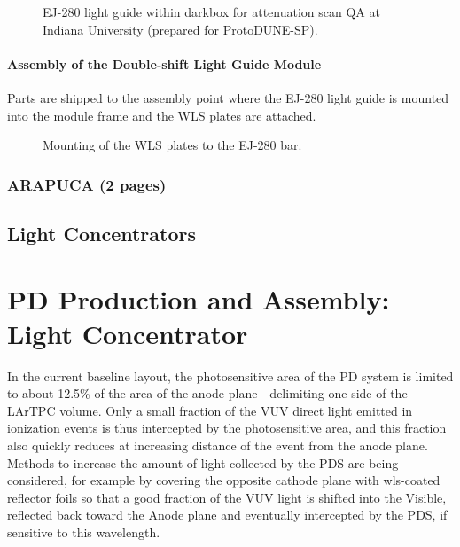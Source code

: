 \begin{figure}[ht]
  \begin{center}
  \caption{EJ-280 light guide within darkbox for attenuation scan QA at 
Indiana University (prepared for ProtoDUNE-SP).}\label{fig:DoubleShiftLG-EJ280}
  \end{center}
\end{figure}

\paragraph*{Assembly of the Double-shift Light Guide Module}

Parts are shipped to the assembly point where the EJ-280 light guide is mounted 
into the module frame and the WLS plates are attached.

\begin{figure}[ht]
  \begin{center}
  \caption{Mounting of the WLS plates to the EJ-280 bar.}\label{fig:DoubleShiftLG-PlateMounting}
  \end{center}
\end{figure}


\subsubsection{ARAPUCA (2 pages)}
\label{ssec:fdsp-pd-pc-prod-arapuca}



\subsection{Light Concentrators}
\label{sec:fdsp-pd-assy-lc}
	
\section{PD Production and Assembly: Light Concentrator}
In the current baseline layout, the photosensitive area of the PD system is limited to about 12.5\% of the area of the anode plane - delimiting one side of the LArTPC volume. 
Only a small fraction of the VUV direct light emitted in ionization events is thus intercepted by the photosensitive area, and this fraction also 
 quickly reduces at increasing distance of the event from the anode plane. \\
Methods to increase the amount of light collected by the PDS are being considered, for example by covering the opposite cathode plane with wls-coated reflector foils so that a good fraction of the VUV light is shifted into the Visible, reflected back toward the Anode plane and eventually intercepted by the PDS, if sensitive to this wavelength.

